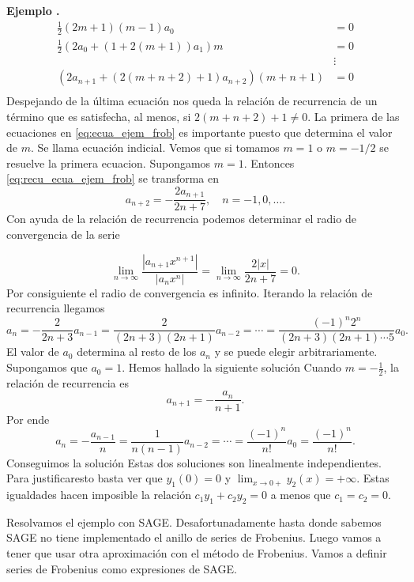 \documentclass{article}
\newcounter{defi_cont}
\newcounter{lem_cont}
\newcounter{ejem_cont}
\newenvironment{ejemplo}[1]{\refstepcounter{ejem_cont}\vspace{1ex}\noindent\textbf{Ejemplo \arabic{ejem_cont}.} #1}{}
\begin{document}
\begin{ejemplo}
\begin{equation}\label{eq:ecua_ejem_frob}
    \begin{split}
      \frac12\left(2m+1\right)(m-1) a_0&=0\\
       \frac{1}{2}  \left(   2 a_{0} + (1+2(m+1)) a_{1}\right)m&=0\\
                                      &\vdots\\
     \left(   2a_{n+1}+ (2(m+n+2)+1)a_{n+2}  \right)(m+n+1) &=0\\
    \end{split}
\end{equation}
Despejando de la última ecuación nos queda la relación de recurrencia de un término
que es satisfecha, al menos, si $2(m+n+2)+1\neq 0$. 
La primera de las ecuaciones en \eqref{eq:ecua_ejem_frob} es importante puesto que determina el valor de $m$. Se llama ecuación indicial. Vemos que si tomamos $m=1$ o $m=-1/2$ se resuelve la primera ecuacion. Supongamos $m=1$. Entonces \eqref{eq:recu_ecua_ejem_frob} se transforma en
\[
a_{n+2}=-\frac{2a_{n+1}}{2n+7},\quad n=-1,0,\ldots.
\]
Con ayuda de la relación de recurrencia podemos determinar el radio de convergencia de la serie

\[\lim_{n\to\infty}\frac{|a_{n+1}x^{n+1}|}{|a_{n}x^{n}|}=
\lim_{n\to\infty}\frac{2|x|}{2n+7}=0.\]
Por consiguiente el radio de convergencia es infinito.  Iterando la relación de recurrencia llegamos 
\[a_{n}=-\frac{2}{2n+3}a_{n-1}=\frac{2}{(2n+3)(2n+1)}a_{n-2}=\cdots=
\frac{(-1)^n2^{n}}{(2n+3)(2n+1)\cdots 5}a_0.\]
El valor de $a_0$ determina al resto de los $a_n$ y se puede elegir arbitrariamente. Supongamos que $a_0=1$. Hemos hallado la siguiente solución  
Cuando $m=-\frac12$, la relación de recurrencia es
\[a_{n+1}=-\frac{a_{n}}{n+1}.\]
Por ende
\[a_n=-\frac{a_{n-1}}{n}=\frac{1}{n(n-1)}a_{n-2}=\cdots=\frac{(-1)^n}{n!}a_{0}=\frac{(-1)^n}{n!}.\]
Conseguimos la solución
Estas dos soluciones son linealmente independientes. Para justificaresto basta ver que $y_1(0)=0$ y $\lim_{x\to 0+}y_2(x)=+\infty$. Estas igualdades hacen imposible la relación $c_1y_1+c_2y_2=0$ a menos que $c_1=c_2=0$.

Resolvamos el ejemplo con SAGE. Desafortunadamente hasta donde sabemos SAGE no tiene implementado el anillo de series de Frobenius. Luego vamos a tener que usar otra aproximación  con el método de Frobenius. Vamos a definir series de Frobenius como expresiones de SAGE. 


\end{ejemplo}
\end{document}
